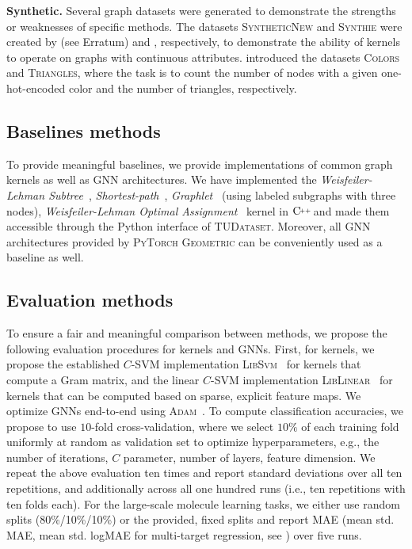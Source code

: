 \documentclass{article}
\newcommand{\xhdr}[1]{{\noindent\bfseries #1}}
\theoremstyle{definition}
\newcommand{\new}[1]{\emph{#1}}
\newcommand{\CPP}[1][]{$\text{C\hspace{-.25ex}}^{_{_{_{++}}}}
	\ifthenelse{\equal{#1}{}}{}{\text{\hspace{-.625ex}#1}}$}
\begin{document}
\xhdr{Synthetic.}
Several graph datasets were generated to demonstrate the strengths or weaknesses of specific methods. The datasets \textsc{SyntheticNew} and \textsc{Synthie} were created by \citet{Fer+2013} (see Erratum) and \citet{Mor+2016}, respectively, to demonstrate the ability of kernels to operate on graphs with continuous attributes. \citet{Knyazev2019} introduced the datasets \textsc{Colors} and \textsc{Triangles}, where the task is to count the number of nodes with a given one-hot-encoded color and the number of triangles, respectively. 

\subsection{Baselines methods} To provide meaningful baselines, we provide implementations of common graph kernels as well as GNN architectures. We have implemented the \new{Weisfeiler-Lehman Subtree}~\cite{She+2011}, \new{Shortest-path}~\cite{Bor+2005}, \new{Graphlet}~\cite{She+2009} (using labeled subgraphs with three nodes), \new{Weisfeiler-Lehman Optimal Assignment}~\cite{Kri+2016} kernel in \CPP and made them accessible through the Python interface of \textsc{TUDataset}.  Moreover, all GNN architectures provided by \textsc{PyTorch Geometric} can be conveniently used as a baseline as well. 

\subsection{Evaluation methods}\label{evalm} To ensure a fair and meaningful comparison between methods, we propose the following evaluation procedures for kernels and GNNs. First, for kernels, we propose the established $C$-SVM implementation \textsc{LibSvm}~\cite{Cha+11} for kernels that compute a Gram matrix, and the linear $C$-SVM implementation \textsc{LibLinear}~\cite{Fan+2008} for kernels  that can be computed based on sparse, explicit feature maps. We optimize GNNs end-to-end using \textsc{Adam}~\cite{Kin+2015}. To compute classification accuracies, we propose to use $10$-fold cross-validation, where we select $10\%$ of each training fold uniformly at random as validation set to optimize hyperparameters, e.g., the number of iterations, $C$ parameter, number of layers, feature dimension. We repeat the above evaluation ten times and report standard deviations over all ten repetitions, and additionally across all one hundred runs (i.e., ten repetitions with ten folds each). For the large-scale molecule learning tasks, we either use random splits (80\%/10\%/10\%) or the provided, fixed splits and report MAE (mean std. MAE, mean std. logMAE for multi-target regression, see \cite{Kli+2020}) over five runs. 
\end{document}
